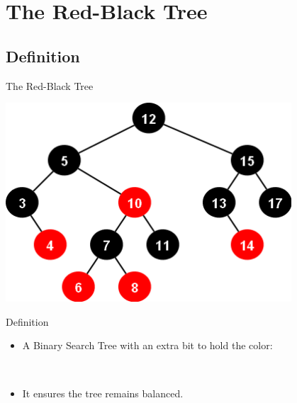 \documentclass{beamer}
\begin{document}
\section{The Red-Black Tree}
\subsection{Definition}

\begin{frame}{The Red-Black Tree}
    \begin{center}
     \includegraphics[width=0.8\textwidth]{redblacktree.png}
     \end{center}
\end{frame}

\begin{frame}{Definition}
\begin{itemize}
    \item \Large A Binary Search Tree with an extra bit to hold the color:
\end{itemize}
\centering{}\\
\begin{itemize}
    \item \Large It ensures the tree remains balanced.
\end{itemize}
\end{frame}
\end{document}
